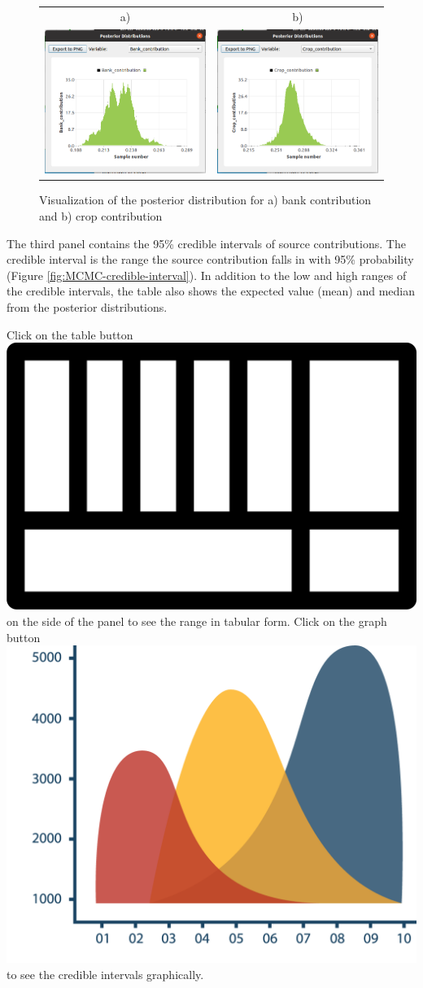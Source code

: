 \documentclass[12pt]{report}
\begin{document}
\begin{figure}[ht]
    \centering
    \begin{tabular}{c c}
        a) & b) \\
        \includegraphics[width=8cm]{Figures/MCMC_Bank_Distribution.png} & \includegraphics[width=8cm]{Figures/MCMC_crop_distribution.png}
    \end{tabular}
    \caption{Visualization of the posterior distribution for a) bank contribution and b) crop contribution}
    \label{fig:MCMC-distributions}
\end{figure}
\FloatBarrier

The third panel contains the 95\% credible intervals of source contributions. The credible interval is the range the source contribution falls in with 95\% probability (Figure \ref{fig:MCMC-credible-interval}). In addition to the low and high ranges of the credible intervals, the table also shows the expected value (mean) and median from the posterior distributions. 

Click on the table button \includegraphics[width=0.5 cm]{Figures/table.png} on the side of the panel to see the range in tabular form. Click on the graph button \includegraphics[width=0.5 cm]{Figures/Graph.png} to see the credible intervals graphically. 
\end{document}
